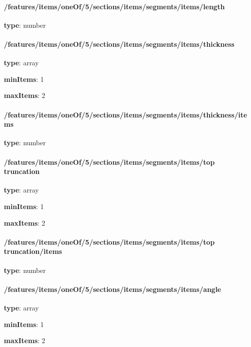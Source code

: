 \paragraph{/features/items/oneOf/5/sections/items/segments/items/length} \begin{itemized}
\item {\bf type}: number
\end{itemized}\paragraph{/features/items/oneOf/5/sections/items/segments/items/thickness} \begin{itemized}
\item {\bf type}: array
\item {\bf minItems}: 1
\item {\bf maxItems}: 2
\paragraph{/features/items/oneOf/5/sections/items/segments/items/thickness/items} \begin{itemized}
\item {\bf type}: number
\end{itemized}\end{itemized}\paragraph{/features/items/oneOf/5/sections/items/segments/items/top truncation} \begin{itemized}
\item {\bf type}: array
\item {\bf minItems}: 1
\item {\bf maxItems}: 2
\paragraph{/features/items/oneOf/5/sections/items/segments/items/top truncation/items} \begin{itemized}
\item {\bf type}: number
\end{itemized}\end{itemized}\paragraph{/features/items/oneOf/5/sections/items/segments/items/angle} \begin{itemized}
\item {\bf type}: array
\item {\bf minItems}: 1
\item {\bf maxItems}: 2

\end{itemized}
